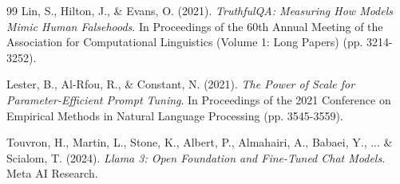 \documentclass[12pt,a4paper]{report}
\begin{document}
\begin{thebibliography}{99}
Lin, S., Hilton, J., \& Evans, O. (2021).
\textit{TruthfulQA: Measuring How Models Mimic Human Falsehoods}.
In Proceedings of the 60th Annual Meeting of the Association for Computational Linguistics (Volume 1: Long Papers) (pp. 3214-3252).

Lester, B., Al-Rfou, R., \& Constant, N. (2021).
\textit{The Power of Scale for Parameter-Efficient Prompt Tuning}.
In Proceedings of the 2021 Conference on Empirical Methods in Natural Language Processing (pp. 3545-3559).

Touvron, H., Martin, L., Stone, K., Albert, P., Almahairi, A., Babaei, Y., ... \& Scialom, T. (2024).
\textit{Llama 3: Open Foundation and Fine-Tuned Chat Models}.
Meta AI Research.

\end{thebibliography}
\end{document}

